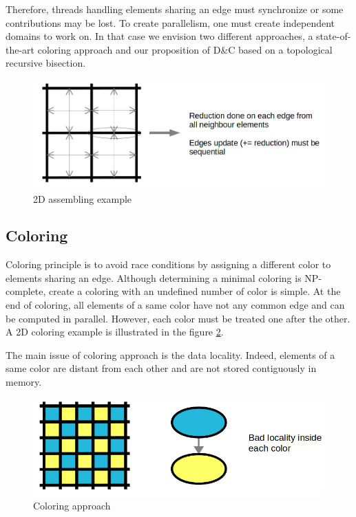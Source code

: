 \documentclass{IOS-Book-Article}
\begin{document}
Therefore, threads handling elements sharing an edge must synchronize or some contributions may be lost. To create parallelism, one must create independent domains to work on.
In that case we envision two different approaches, a state-of-the-art coloring approach and our proposition of D\&C based on a topological recursive bisection.
\begin{figure}[htp]
 \centering
 \includegraphics[scale=0.2]{2D_assembly.png}
 \caption{2D assembling example}
 \label{fig:2Dasm}
\end{figure}

\subsection{Coloring}
\label{sec:col}
Coloring principle is to avoid race conditions by assigning a different color to elements sharing an edge.
Although determining a minimal coloring is NP-complete, create a coloring with an undefined number of color is simple.
At the end of coloring, all elements of a same color have not any common edge and can be computed in parallel. However, each color must be treated one after the other.
A 2D coloring example is illustrated in the figure \ref{fig:colApp}.

The main issue of coloring approach is the data locality. Indeed, elements of a same color are distant from each other and are not stored contiguously in memory.
\begin{figure}[htp]
 \centering
 \includegraphics[scale=0.25]{Coloring_approach.png}
 \caption{Coloring approach}
 \label{fig:colApp}
\end{figure}
\end{document}
